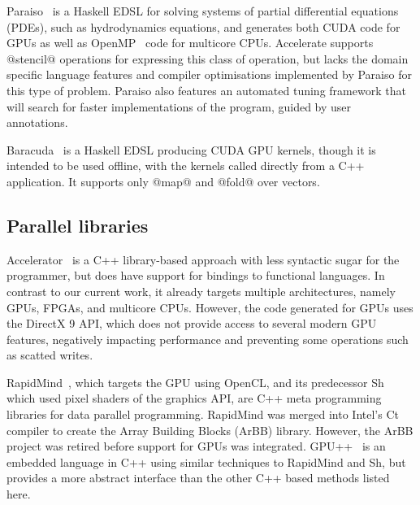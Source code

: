 
Paraiso~\cite{Muranushi:2012eh} is a Haskell EDSL for solving systems of
partial differential equations (PDEs), such as hydrodynamics equations,
and generates both CUDA code for GPUs as well as OpenMP~\cite{OpenMP:2008} code
for multicore CPUs. Accelerate supports @stencil@ operations for expressing this
class of operation, but lacks the domain specific language features and compiler
optimisations implemented by Paraiso for this type of problem. Paraiso also
features an automated tuning framework that will search for faster
implementations of the program, guided by user annotations.

Baracuda~\cite{Larsen:2011fa} is a Haskell EDSL producing CUDA GPU kernels,
though it is intended to be used offline, with the kernels called directly from
a C++ application. It supports only @map@ and @fold@ over vectors.


\subsection{Parallel libraries}


Accelerator~\cite{Bond:2010bd,Tarditi:2006} is a C++ library-based approach with
less syntactic sugar for the programmer, but does have support for bindings to
functional languages. In contrast to our current work, it already targets
multiple architectures, namely GPUs, FPGAs, and multicore CPUs. However, the
code generated for GPUs uses the DirectX 9 API, which does not provide access to
several modern GPU features, negatively impacting performance and preventing
some operations such as scatted writes.

RapidMind~\cite{LinXu:2008ig}, which targets the GPU using OpenCL, and its
predecessor Sh~\cite{McCool:2004,McCool:2004un} which used pixel shaders of the
graphics API, are C++ meta programming libraries for data parallel programming.
RapidMind was merged into Intel's Ct compiler to create the Array Building
Blocks (ArBB) library. However, the ArBB project was retired before support for
GPUs was integrated. GPU++~\cite{Jansen:2008vw} is an embedded language in C++
using similar techniques to RapidMind and Sh, but provides a more abstract
interface than the other C++ based methods listed here.

